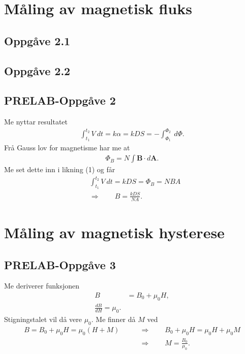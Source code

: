 \documentclass[11pt, a4paper]{article}
\newcommand{\vb}{\mathbf}
\begin{document}
\section*{Måling av magnetisk fluks}


  \subsection*{Oppgåve 2.1}


  \subsection*{Oppgåve 2.2}

  \subsection*{PRELAB-Oppgåve 2}
    Me nyttar resultatet
    \begin{align}
      \int_{t_1}^{t_2}V\ dt = k\alpha = kDS = -\int_{\Phi_1}^{\Phi_2} \ d\Phi.
    \end{align}
    Frå Gauss lov for magnetisme har me at
    \begin{align*}
      \Phi_B = N\int\vb{B} \cdot d\vb{A}.
    \end{align*}
    Me set dette inn i likning (1) og får
    \begin{align*}
      &\int_{t_1}^{t_2}V \ dt = kDS = \Phi_B = NBA \\ 
      &\Rightarrow \qquad B = \frac{kDS}{NA}.
    \end{align*}



\newpage


\section*{Måling av magnetisk hysterese}


  \subsection*{PRELAB-Oppgåve 3}
    Me deriverer funksjonen
    \begin{align*}
      B &= B_0 + \mu_0H, \\
      \frac{dB}{dH} = \mu_0.
    \end{align*}
    Stigningstalet vil då vere $\mu_0$. Me finner då $M$ ved
    \begin{align*}
      B = B_0 + \mu_0H = \mu_0\left( H + M \right) \qquad &\Rightarrow \qquad B_0 + \mu_0H = \mu_0H + \mu_0M \\
      &\Rightarrow \qquad M = \frac{B_0}{\mu_0}.
    \end{align*}
\end{document}
